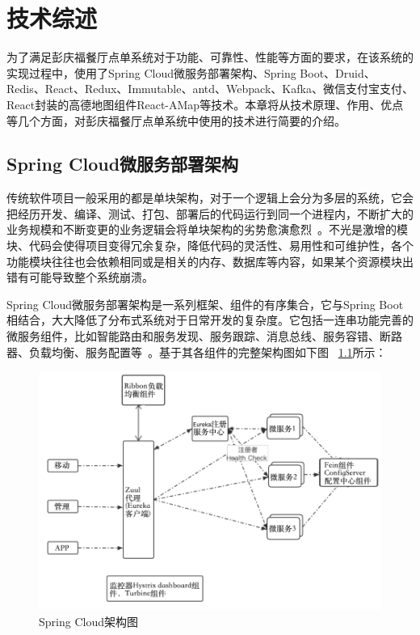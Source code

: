 \chapter{技术综述}
为了满足彭庆福餐厅点单系统对于功能、可靠性、性能等方面的要求，在该系统的实现过程中，使用了Spring Cloud微服务部署架构、Spring Boot、Druid、Redis、React、Redux、Immutable、antd、Webpack、Kafka、微信支付宝支付、React封装的高德地图组件React-AMap等技术。本章将从技术原理、作用、优点等几个方面，对彭庆福餐厅点单系统中使用的技术进行简要的介绍。

\section{Spring Cloud微服务部署架构}
传统软件项目一般采用的都是单块架构，对于一个逻辑上会分为多层的系统，它会把经历开发、编译、测试、打包、部署后的代码运行到同一个进程内，不断扩大的业务规模和不断变更的业务逻辑会将单块架构的劣势愈演愈烈~\cite{sharma2017mastering}。不光是激增的模块、代码会使得项目变得冗余复杂，降低代码的灵活性、易用性和可维护性，各个功能模块往往也会依赖相同或是相关的内存、数据库等内容，如果某个资源模块出错有可能导致整个系统崩溃。

Spring Cloud微服务部署架构是一系列框架、组件的有序集合，它与Spring Boot相结合，大大降低了分布式系统对于日常开发的复杂度。它包括一连串功能完善的微服务组件，比如智能路由和服务发现、服务跟踪、消息总线、服务容错、断路器、负载均衡、服务配置等~\cite{zsf2019}。基于其各组件的完整架构图如下图
~\ref{fig_springCloudCH2}所示：
\begin{figure}[htbp!]
    \centering
    \includegraphics[width=5in]{FIGs/chapter2/springCloud.pdf}
    \caption{Spring Cloud架构图}\label{fig_springCloudCH2}
\end{figure}

